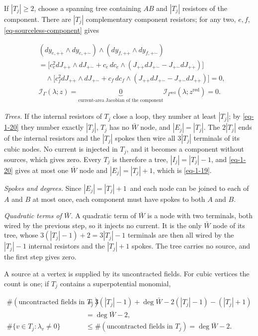 \documentclass[11pt]{article}
\numberwithin{equation}{section}
\numberwithin{figure}{section}
\numberwithin{table}{section}
\begin{document}
If $|T_j|\ge2$, choose a spanning tree containing $AB$ and $|T_j|$ resistors of the component. There are $|T_j|$ complementary component resistors; for any two, $e,f$, \eqref{eq-sourceless-component} gives

\begin{equation*}
\begin{aligned}
&(dy_{e,+\dot+}\wedge dy_{e,+\dot-})
\wedge(dy_{f,+\dot+}\wedge dy_{f,+\dot-})\\
&=\Big[c_e^2dJ_{+\dot+}\wedge dJ_{+\dot-}
+c_e\,dc_e\wedge(J_{+\dot+}dJ_{+\dot-}-J_{+\dot-}dJ_{+\dot+})\Big]\\
&\quad\wedge\Big[c_f^2dJ_{+\dot+}\wedge dJ_{+\dot-}
+c_f\,dc_f\wedge(J_{+\dot+}dJ_{+\dot-}-J_{+\dot-}dJ_{+\dot+})\Big]=0,\\
&\mathcal I_\Gamma(\lambda;z)
=\underbrace{0}_{\text{current-area Jacobian of the component}}
\mathcal I_{\Gamma^{\mathrm{red}}}(\lambda;z^{\mathrm{red}})=0.
\end{aligned}
\end{equation*}

\emph{Trees.} If the internal resistors of $T_j$ close a loop, they number at least $|T_j|$; by \eqref{eq-1-20} they number exactly $|T_j|$, $T_j$ has no $\bar W$ node, and $|E_j|=|T_j|$. The $2|T_j|$ ends of the internal resistors and the $|T_j|$ spokes then wire all $3|T_j|$ terminals of its cubic nodes. No current is injected in $T_j$, and it becomes a component without sources, which gives zero. Every $T_j$ is therefore a tree, $|I_j|=|T_j|-1$, and \eqref{eq-1-20} gives at most one $\bar W$ node and $|E_j|=|T_j|+1$, which is \eqref{eq-1-19}.

\emph{Spokes and degrees.} Since $|E_j|=|T_j|+1$~and each node can be joined to each of $A$ and $B$ at most once, each component must have spokes to both $A$ and $B$.

\emph{Quadratic terms of $\bar W$.} A quadratic term of $\bar W$ is a node with two terminals, both wired by the previous step, so it injects no current. It is the only $\bar W$ node of its tree, whose $3(|T_j|-1)+2=3|T_j|-1$ terminals are then all wired by the $|T_j|-1$ internal resistors and the $|T_j|+1$ spokes. The tree carries no source, and the first step gives zero.~

A source at a vertex is supplied by its uncontracted fields. For cubic vertices the count is one; if $T_j$ contains a superpotential monomial,

\begin{equation*}
\begin{aligned}
\#(\text{uncontracted fields in }T_j)
&=3(|T_j|-1)+\deg\bar W-2(|T_j|-1)-(|T_j|+1)\\
&=\deg\bar W-2,\\
\#\{v\in T_j:\lambda_v\ne0\}
&\le\#(\text{uncontracted fields in }T_j)=\deg\bar W-2.
\end{aligned}
\end{equation*}
\end{document}
